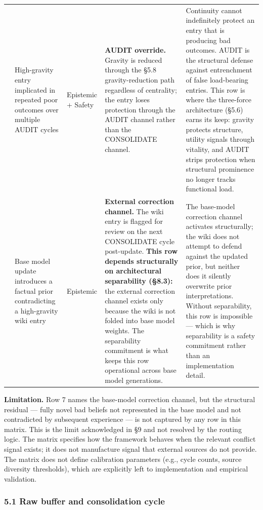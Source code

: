\documentclass[
  11pt,
]{article}
\begin{document}
\begin{longtable}{@{}>{\raggedright\arraybackslash}p{0.35cm}>{\raggedright\arraybackslash}p{2.8cm}>{\raggedright\arraybackslash}p{1.7cm}>{\raggedright\arraybackslash}p{4.8cm}>{\raggedright\arraybackslash}p{5.6cm}@{}}
6 & High-gravity entry implicated in repeated poor outcomes over multiple AUDIT cycles & Epistemic + Safety & \textbf{AUDIT override.} Gravity is reduced through the \S5.8 gravity-reduction path regardless of centrality; the entry loses protection through the AUDIT channel rather than the CONSOLIDATE channel. & Continuity cannot indefinitely protect an entry that is producing bad outcomes. AUDIT is the structural defense against entrenchment of false load-bearing entries. This row is where the three-force architecture (\S5.6) earns its keep: gravity protects structure, utility signals through vitality, and AUDIT strips protection when structural prominence no longer tracks functional load. \\
\addlinespace
7 & Base model update introduces a factual prior contradicting a high-gravity wiki entry & Epistemic & \textbf{External correction channel.} The wiki entry is flagged for review on the next CONSOLIDATE cycle post-update. \textbf{This row depends structurally on architectural separability (\S8.3):} the external correction channel exists only because the wiki is not folded into base model weights. The separability commitment is what keeps this row operational across base model generations. & The base-model correction channel activates structurally; the wiki does not attempt to defend against the updated prior, but neither does it silently overwrite prior interpretations. Without separability, this row is impossible --- which is why separability is a safety commitment rather than an implementation detail. \\
\bottomrule
\end{longtable}
\endgroup

\textbf{Limitation.} Row 7 names the base-model correction channel, but
the structural residual --- fully novel bad beliefs not represented in
the base model and not contradicted by subsequent experience --- is not
captured by any row in this matrix. This is the limit acknowledged in §9
and not resolved by the routing logic. The matrix specifies how the
framework behaves when the relevant conflict signal exists; it does not
manufacture signal that external sources do not provide. The matrix does
not define calibration parameters (e.g., cycle counts, source diversity
thresholds), which are explicitly left to implementation and empirical
validation.

\hypertarget{raw-buffer-and-consolidation-cycle}{%
\subsubsection{5.1 Raw buffer and consolidation
cycle}\label{raw-buffer-and-consolidation-cycle}}
\end{document}
